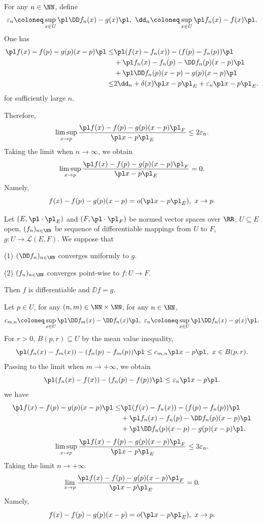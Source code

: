 \begin{proofenv}
    For any $n\in \NN$, define
    $$ \varepsilon_n\coloneq \sup_{x\in U}\pl \DD f_n(x)-g(x)\pl,\ \dd_n\coloneq \sup_{x\in U}\pl f_n(x)-f(x)\pl.$$
    One has 
    \begin{align*}
        \pl f(x)-f(p)-g(p)(x-p)\pl \le& \pl (f(x)-f_n(x))-(f(p)-f_n(p))\pl\\
        &+\pl  f_n(x)-f_n(p) -\DD f_n(p)(x-p)\pl\\
        &+\pl \DD f_n(p)(x-p)-g(p)(x-p)\pl\\
        \le & 2 \dd_n+\delta(x)\pl x-p\pl_E+\varepsilon_n\pl x-p\pl_E.
    \end{align*}
    for sufficiently large $n$.

    Therefore, 
    $$ \limsup_{x\rightarrow p} \frac{\pl f(x)-f(p)-g(p)(x-p)\pl_F}{\pl x-p\pl_E}\le 2\varepsilon_n.$$
    Taking the limit when $n\rightarrow \infty$, we obtain
    $$ \limsup_{x\rightarrow p} \frac{\pl f(x)-f(p)-g(p)(x-p)\pl_F}{\pl x-p\pl_E}=0.$$
    Namely, 
    $$ f(x)-f(p)-g(p)(x-p)=o(\pl x-p\pl_E),\ x\rightarrow p.$$
\end{proofenv}
\begin{theoremenv}\label{9.10.7}
    Let $(E,\pl\cdot\pl_E)$ and $(F,\pl\cdot\pl_F)$ be normed vector spaces over $\RR$, $U\subseteq E$ open, $(f_n)_{n\in\NN}$ be sequence of differentiable mappings from $U$ to $F$, $g:U\longrightarrow \mathscr{L}(E,F)$. We suppose that

    (1) $(\DD f_n)_{n\in\NN}$ converges uniformly to $g$.

    (2) $(f_n)_{n\in\NN}$ converges point-wise to $f: U\longrightarrow F$.

    Then $f$ is differentiable and $\DD f=g$.
\end{theoremenv}
\begin{proofenv}
    Let $p\in U$, for any $(n,m)\in \NN\times\NN$, for any $n\in\NN$,
    $$ c_{m,n}\coloneq \sup_{x\in U}\pl \DD f_m(x)-\DD f_n(x)\pl, \ \varepsilon_n\coloneq \sup_{x\in U}\pl \DD f_n(x)-g(x)\pl.$$
    For $r>0$, $B(p,r)\subseteq U$ by the mean value inequality,
    $$ \pl (f_n(x)-f_m(x))-(f_n(p)-f_m(p))\pl \le c_{m,n}\pl x-p\pl, \  x\in B(p,r) .$$
    Passing to the limit when $m\rightarrow +\infty$, we obtain
    $$ \pl (f_n(x)-f(x))-(f_n(p)-f(p))\pl \le \varepsilon_n \pl x-p\pl.$$
    we have 
    \begin{align*}
        \pl f(x)-f(p)-g(p)(x-p)\pl \le & \pl (f(x)-f_n(x))-(f(p)-f_n(p))\pl \\
        &+\pl f_n(x)-f_n(p) -\DD f_n(p)(x-p)\pl\\
        &+\pl \DD f_n(p)(x-p)-g(p)(x-p)\pl.
    \end{align*}
    $$ \limsup_{x\rightarrow p} \frac{\pl f(x)-f(p)-g(p)(x-p)\pl_F}{\pl x-p\pl_E}\le 3\varepsilon_n.$$
    Taking the limit $n\rightarrow+\infty$
    $$ \lim_{x\rightarrow p} \frac{\pl f(x)-f(p)-g(p)(x-p)\pl_F}{\pl x-p\pl_E}=0.$$
    Namely, 
    $$ f(x)-f(p)-g(p)(x-p)=o(\pl x-p\pl_E),\ x\rightarrow p.$$
\end{proofenv}
